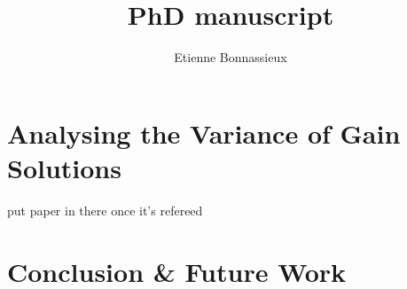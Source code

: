 \documentclass[11pt,a4paper,notitlepage]{book}
\author{Etienne Bonnassieux}
\title{PhD manuscript}
\begin{document}

%
%

\newpage
\setcounter{page}{1}




\chapter{Analysing the Variance of Gain Solutions}
put paper in there once it's refereed
%

%
%











\chapter{Conclusion \& Future Work}



\appendix

%



\end{document}

